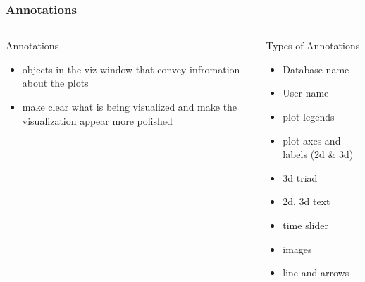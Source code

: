 \begin{frame}
\frametitle{Annotations}
\begin{columns}
\begin{column}{5cm}
\begin{block}{Annotations}
\begin{itemize}
	\item objects in the viz-window
		that convey infromation about the plots
	\item make clear what is being visualized and make
		the visualization appear more polished
\end{itemize}
\end{block}
\end{column}
\begin{column}{5cm}
\begin{block}{Types of Annotations}
\begin{itemize}
        \item Database name
        \item User name
	\item plot legends
	\item plot axes and labels (2d \& 3d)
	\item 3d triad
	\item 2d, 3d text
	\item time slider
	\item images
	\item line and arrows
\end{itemize}
\end{block}
\end{column}
\end{columns}
\end{frame}


